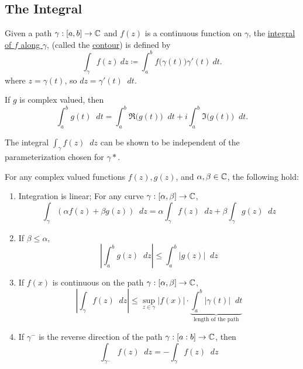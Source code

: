 \documentclass[11pt]{article}
\newcommand*\dif{\mathop{}\!d}
\begin{document}
\subsection{The Integral}
\begin{definition}
Given a path $\gamma:[a,b] \to \mathbb{C}$ and $f(z)$ is a continuous function on
$\gamma$, the \underline{integral of $f$ along $\gamma$}, (called the
\underline{contour}) is defined by
\begin{equation*}
\int_\gamma f(z)\>dz \coloneqq \int^b_a f\big(\gamma(t)\big)\gamma'(t)\>dt.
\end{equation*}
where $z = \gamma(t)$, so $dz = \gamma'(t)\dif t$.
\end{definition}
\begin{remark}
If $g$ is complex valued, then
\begin{equation*}
\int^b_a g(t)\dif t = \int^b_a \Re\big(g(t)\big)\dif t + i \int^b_a
\Im\big(g(t)\big)\dif t.
\end{equation*}
\end{remark}
\begin{remark}
The integral $\int_\gamma f(z)\dif z$ can be shown to be independent of the
parameterization chosen for $\gamma*$.
\end{remark}
\begin{theorem}
For any complex valued functions $f(z), g(z)$, and $\alpha, \beta \in \mathbb{C}$, the
following hold:
\begin{enumerate}
\item Integration is linear; For any curve $\gamma:[\alpha,\beta] \to \mathbb{C}$,
\begin{equation*} \int_{\gamma} (\alpha f(z) + \beta g(z))\dif z =
\alpha\int_\gamma f(z)\dif z + \beta\int_\gamma g(z)\dif z
\end{equation*}
\item If $\beta \leq \alpha$,
\begin{equation*}
\left| \int_a^b g(z)\dif z\right| \leq \int_a^b |g(z)| \dif z
\end{equation*}
\item If $f(x)$ is continuous on the path $\gamma:[\alpha,\beta] \to \mathbb{C}$,
\begin{equation*}
\left| \int_\gamma f(z)\dif z\right| \leq \sup_{z \in \gamma} |f(x)| \cdot
\underbrace{\int_a^b |\gamma(t)| \dif t}_{\text{length of the path}}
\end{equation*}
\item If $\gamma^-$ is the reverse direction of the path $\gamma:[a:b]\to\mathbb{C}$,
then
\begin{equation*}
\int_{\gamma^-} f(z)\dif z = -\int_\gamma f(z)\dif z
\end{equation*}
\end{enumerate}
\end{theorem}
\end{document}
